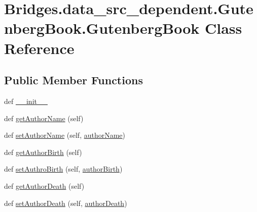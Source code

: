 \hypertarget{class_bridges_1_1data__src__dependent_1_1_gutenberg_book_1_1_gutenberg_book}{}\section{Bridges.\+data\+\_\+src\+\_\+dependent.\+Gutenberg\+Book.\+Gutenberg\+Book Class Reference}
\label{class_bridges_1_1data__src__dependent_1_1_gutenberg_book_1_1_gutenberg_book}
\subsection*{Public Member Functions}
\begin{DoxyCompactItemize}
\item 
def \hyperlink{class_bridges_1_1data__src__dependent_1_1_gutenberg_book_1_1_gutenberg_book_ac8346f638901d9adf9c03c24eba1ab99}{\+\_\+\+\_\+init\+\_\+\+\_\+}
\item 
def \hyperlink{class_bridges_1_1data__src__dependent_1_1_gutenberg_book_1_1_gutenberg_book_a7a6447f67fe2a342f416fa24ea6a2588}{get\+Author\+Name} (self)
\item 
def \hyperlink{class_bridges_1_1data__src__dependent_1_1_gutenberg_book_1_1_gutenberg_book_a62ef4e115cc39b57fb5a5ec1cdd085ce}{set\+Author\+Name} (self, \hyperlink{class_bridges_1_1data__src__dependent_1_1_gutenberg_book_1_1_gutenberg_book_a6be81603dd5a4894946ecdf876836f87}{author\+Name})
\item 
def \hyperlink{class_bridges_1_1data__src__dependent_1_1_gutenberg_book_1_1_gutenberg_book_ab3bd88eebf0872ecb06932296dd5bcea}{get\+Author\+Birth} (self)
\item 
def \hyperlink{class_bridges_1_1data__src__dependent_1_1_gutenberg_book_1_1_gutenberg_book_a74902b827c2b29b08b7d6ac4ccf56333}{set\+Authro\+Birth} (self, \hyperlink{class_bridges_1_1data__src__dependent_1_1_gutenberg_book_1_1_gutenberg_book_a80097f424d1a9dd5c5c0b71e85b23132}{author\+Birth})
\item 
def \hyperlink{class_bridges_1_1data__src__dependent_1_1_gutenberg_book_1_1_gutenberg_book_a8cda3506cf6e092d1e935d0c8feb409b}{get\+Author\+Death} (self)
\item 
def \hyperlink{class_bridges_1_1data__src__dependent_1_1_gutenberg_book_1_1_gutenberg_book_a9fd3a315bae40b0a0ff32b8df01ca6f6}{set\+Author\+Death} (self, \hyperlink{class_bridges_1_1data__src__dependent_1_1_gutenberg_book_1_1_gutenberg_book_a08ff3d5f18a0fc670e61372ff0eee9d7}{author\+Death})

\end{DoxyCompactItemize}
